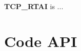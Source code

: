 

{\bfseries TCP\_\-RTAI} is ...\hypertarget{index_codeapi}{}\section{Code API}\label{index_codeapi}
